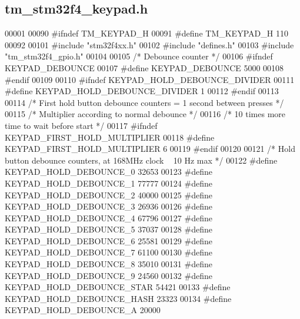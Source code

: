 \hypertarget{tm__stm32f4__keypad_8h_source}{}\subsection{tm\+\_\+stm32f4\+\_\+keypad.\+h}

\begin{DoxyCode}
00001 
00090 \textcolor{preprocessor}{#ifndef TM\_KEYPAD\_H}
00091 \textcolor{preprocessor}{#define TM\_KEYPAD\_H 110}
00092 
00101 \textcolor{preprocessor}{#include "stm32f4xx.h"}
00102 \textcolor{preprocessor}{#include "defines.h"}
00103 \textcolor{preprocessor}{#include "tm\_stm32f4\_gpio.h"}
00104 
00105 \textcolor{comment}{/* Debounce counter */}
00106 \textcolor{preprocessor}{#ifndef KEYPAD\_DEBOUNCE}
00107 \textcolor{preprocessor}{#define KEYPAD\_DEBOUNCE                 5000}
00108 \textcolor{preprocessor}{#endif}
00109 
00110 \textcolor{preprocessor}{#ifndef KEYPAD\_HOLD\_DEBOUNCE\_DIVIDER}
00111 \textcolor{preprocessor}{#define KEYPAD\_HOLD\_DEBOUNCE\_DIVIDER    1}
00112 \textcolor{preprocessor}{#endif}
00113 
00114 \textcolor{comment}{/* First hold button debounce counters = 1 second between presses */}
00115 \textcolor{comment}{/* Multiplier according to normal debounce */}
00116 \textcolor{comment}{/* 10 times more time to wait before start */}
00117 \textcolor{preprocessor}{#ifndef KEYPAD\_FIRST\_HOLD\_MULTIPLIER}
00118 \textcolor{preprocessor}{#define KEYPAD\_FIRST\_HOLD\_MULTIPLIER    6}
00119 \textcolor{preprocessor}{#endif}
00120 
00121 \textcolor{comment}{/* Hold button debounce counters, at 168MHz clock ~ 10 Hz max */}
00122 \textcolor{preprocessor}{#define KEYPAD\_HOLD\_DEBOUNCE\_0      32653}
00123 \textcolor{preprocessor}{#define KEYPAD\_HOLD\_DEBOUNCE\_1      77777}
00124 \textcolor{preprocessor}{#define KEYPAD\_HOLD\_DEBOUNCE\_2      40000}
00125 \textcolor{preprocessor}{#define KEYPAD\_HOLD\_DEBOUNCE\_3      26936}
00126 \textcolor{preprocessor}{#define KEYPAD\_HOLD\_DEBOUNCE\_4      67796}
00127 \textcolor{preprocessor}{#define KEYPAD\_HOLD\_DEBOUNCE\_5      37037}
00128 \textcolor{preprocessor}{#define KEYPAD\_HOLD\_DEBOUNCE\_6      25581}
00129 \textcolor{preprocessor}{#define KEYPAD\_HOLD\_DEBOUNCE\_7      61100}
00130 \textcolor{preprocessor}{#define KEYPAD\_HOLD\_DEBOUNCE\_8      35010}
00131 \textcolor{preprocessor}{#define KEYPAD\_HOLD\_DEBOUNCE\_9      24560}
00132 \textcolor{preprocessor}{#define KEYPAD\_HOLD\_DEBOUNCE\_STAR   54421}
00133 \textcolor{preprocessor}{#define KEYPAD\_HOLD\_DEBOUNCE\_HASH   23323}
00134 \textcolor{preprocessor}{#define KEYPAD\_HOLD\_DEBOUNCE\_A      20000}

\end{DoxyCode}
